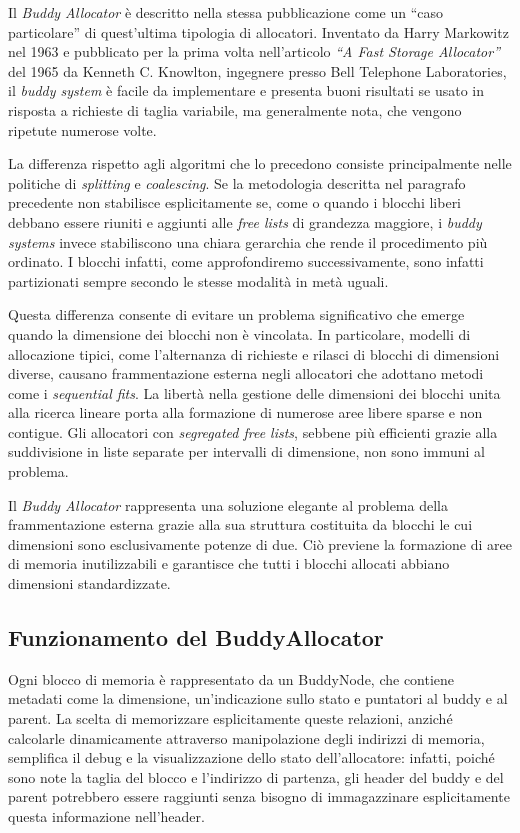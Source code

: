 Il \textit{Buddy Allocator} è descritto nella stessa pubblicazione come un “caso particolare” di quest'ultima tipologia di allocatori. Inventato da Harry Markowitz nel 1963 e pubblicato per la prima volta nell’articolo \textit{“A Fast Storage Allocator”}~\cite{knowlton1965} del 1965 da Kenneth C. Knowlton, ingegnere presso Bell Telephone Laboratories, il \textit{buddy system} è facile da implementare e presenta buoni risultati se usato in risposta a richieste di taglia variabile, ma generalmente nota, che vengono ripetute numerose volte.
 
La differenza rispetto agli algoritmi che lo precedono consiste principalmente nelle politiche di \textit{splitting} e \textit{coalescing}. Se la metodologia descritta nel paragrafo precedente non stabilisce esplicitamente se, come o quando i blocchi liberi debbano essere riuniti e aggiunti alle \textit{free lists} di grandezza maggiore, i \textit{buddy systems} invece stabiliscono una chiara gerarchia che rende il procedimento più ordinato. I blocchi infatti, come approfondiremo successivamente, sono infatti partizionati sempre secondo le stesse modalità in metà uguali.

Questa differenza consente di evitare un problema significativo che emerge quando la dimensione dei blocchi non è vincolata. In particolare, modelli di allocazione tipici, come l'alternanza di richieste e rilasci di blocchi di dimensioni diverse, causano frammentazione esterna negli allocatori che adottano metodi come i \textit{sequential fits}. La libertà nella gestione delle dimensioni dei blocchi unita alla ricerca lineare porta alla formazione di numerose aree libere sparse e non contigue. Gli allocatori con \textit{segregated free lists}, sebbene più efficienti grazie alla suddivisione in liste separate per intervalli di dimensione, non sono immuni al problema.

Il \textit{Buddy Allocator} rappresenta una soluzione elegante al problema della frammentazione esterna grazie alla sua struttura costituita da blocchi le cui dimensioni sono esclusivamente potenze di due. Ciò previene la formazione di aree di memoria inutilizzabili e garantisce che tutti i blocchi allocati abbiano dimensioni standardizzate.

\subsection*{Funzionamento del BuddyAllocator}
Ogni blocco di memoria è rappresentato da un BuddyNode, che contiene metadati come la dimensione, un’indicazione sullo stato e puntatori al buddy e al parent. La scelta di memorizzare esplicitamente queste relazioni, anziché calcolarle dinamicamente attraverso manipolazione degli indirizzi di memoria, semplifica il debug e la visualizzazione dello stato dell'allocatore: infatti, poiché sono note la taglia del blocco e l’indirizzo di partenza, gli header del buddy e del parent potrebbero essere raggiunti senza bisogno di immagazzinare esplicitamente questa informazione nell’header.


